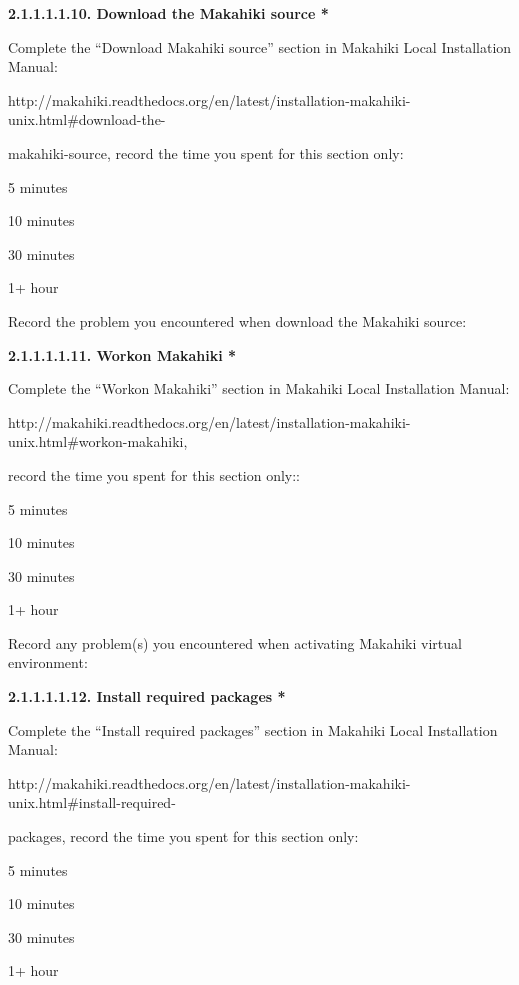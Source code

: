 {\bf 2.1.1.1.1.10. Download the Makahiki source *}

Complete the ``Download Makahiki source'' section in Makahiki Local Installation Manual:

http://makahiki.readthedocs.org/en/latest/installation-makahiki-unix.html\#download-the-

makahiki-source, record the time you spent for this section only:

\begin{radiobutton}
\item 5 minutes
\item  10 minutes
\item  30 minutes
\item  1+ hour
\end{radiobutton}

Record the problem you encountered when download the Makahiki source: \underline{\hspace{3cm}}

{\bf 2.1.1.1.1.11. Workon Makahiki *}

Complete the ``Workon Makahiki'' section in Makahiki Local Installation Manual:

http://makahiki.readthedocs.org/en/latest/installation-makahiki-unix.html\#workon-makahiki, 

record the time you spent for this section only::

\begin{radiobutton}
\item 5 minutes
\item  10 minutes
\item  30 minutes
\item  1+ hour
\end{radiobutton}

Record any problem(s) you encountered when activating Makahiki virtual environment: 

\underline{\hspace{4cm}}

{\bf 2.1.1.1.1.12. Install required packages *}

Complete the ``Install required packages'' section in Makahiki Local Installation Manual:

http://makahiki.readthedocs.org/en/latest/installation-makahiki-unix.html\#install-required-

packages,  record the time you spent for this section only:

\begin{radiobutton}
\item 5 minutes
\item  10 minutes
\item  30 minutes
\item  1+ hour
\end{radiobutton}

